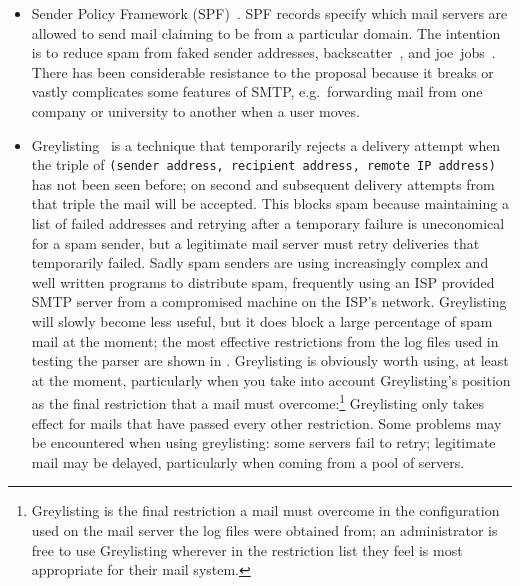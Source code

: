 \begin{itemize}

    \item Sender Policy Framework (SPF)~\cite{openspf}.  SPF\label{spf
        introduction} records specify which mail servers are allowed to
        send mail claiming to be from a particular domain.  The intention
        is to reduce spam from faked sender addresses,
        backscatter~\cite{postfix-backscatter}, and
        joe~jobs~\cite{Wikipedia-joe-job}.  There has been
        considerable resistance to the proposal because it breaks or vastly
        complicates some features of \gls{SMTP}, e.g.\ forwarding mail from
        one company or university to another when a user moves.

    \item Greylisting~\cite{greylisting} is a technique that temporarily
        rejects a delivery attempt when the triple of \newline{}
        \tab{}\texttt{(sender address, recipient address, remote \gls{IP}
        address)}\newline{} has not been seen before; on second and
        subsequent delivery attempts from that triple the mail will be
        accepted.  This blocks spam because maintaining a list of failed
        addresses and retrying after a temporary failure is uneconomical
        for a spam sender, but a legitimate mail server must retry
        deliveries that temporarily failed.  Sadly spam senders are using
        increasingly complex and well written programs to distribute spam,
        frequently using an ISP provided \gls{SMTP} server from a
        compromised machine on the ISP's network.  Greylisting will slowly
        become less useful, but it does block a large percentage of spam
        mail at the moment; the most effective restrictions from the
        \numberOFlogFILES{} log files used in testing the parser are shown
        in .  Greylisting is obviously
        worth using, at least at the moment, particularly when you take
        into account Greylisting's position as the final restriction that a
        mail must overcome:\footnote{Greylisting is the final restriction a
        mail must overcome in the configuration used on the mail server the
        log files were obtained from; an administrator is free to use
        Greylisting wherever in the restriction list they feel is most
        appropriate for their mail system.} Greylisting only takes effect
        for mails that have passed every other restriction.  Some problems
        may be encountered when using greylisting: some servers fail to
        retry; legitimate mail may be delayed, particularly when coming
        from a pool of servers.


\end{itemize}
